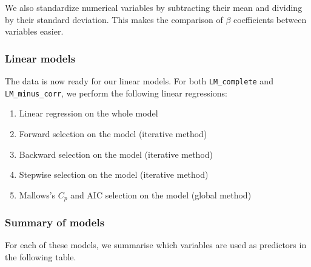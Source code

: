 \documentclass[
  paper=a4,
  ,captions=tableheading
]{scrartcl}
\providecommand{\tightlist}{%
  \setlength{\itemsep}{0pt}\setlength{\parskip}{0pt}}
\begin{document}
We also standardize numerical variables by subtracting their mean and
dividing by their standard deviation. This makes the comparison of
\(\beta\) coefficients between variables easier.

\hypertarget{linear-models}{%
\subsubsection{Linear models}\label{linear-models}}

The data is now ready for our linear models. For both
\texttt{LM\_complete} and \texttt{LM\_minus\_corr}, we perform the
following linear regressions:

\begin{enumerate}
\def\labelenumi{\arabic{enumi}.}
\tightlist
\item
  Linear regression on the whole model
\item
  Forward selection on the model (iterative method)
\item
  Backward selection on the model (iterative method)
\item
  Stepwise selection on the model (iterative method)
\item
  Mallows's \(C_p\) and AIC selection on the model (global method)
\end{enumerate}

\hypertarget{summary-of-models}{%
\subsubsection{Summary of models}\label{summary-of-models}}

For each of these models, we summarise which variables are used as
predictors in the following table.
\end{document}
